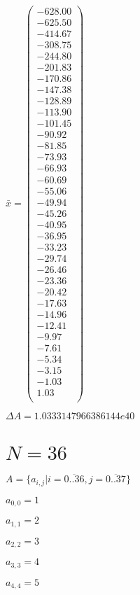 \documentclass[a4paper,12pt]{article}
\begin{document}
$\bar { x } = \begin{pmatrix}
-628.00 \\
-625.50 \\
-414.67 \\
-308.75 \\
-244.80 \\
-201.83 \\
-170.86 \\
-147.38 \\
-128.89 \\
-113.90 \\
-101.45 \\
-90.92 \\
-81.85 \\
-73.93 \\
-66.93 \\
-60.69 \\
-55.06 \\
-49.94 \\
-45.26 \\
-40.95 \\
-36.95 \\
-33.23 \\
-29.74 \\
-26.46 \\
-23.36 \\
-20.42 \\
-17.63 \\
-14.96 \\
-12.41 \\
-9.97 \\
-7.61 \\
-5.34 \\
-3.15 \\
-1.03 \\
1.03 \\
\end{pmatrix}
$

$\Delta A = 1.0333147966386144e40$



\section{ $N = 36$ }
$A = \{ a _{ i, j } | i = \overline { 0..36 }, j = \overline { 0..37 } \}$

$a _{ 0, 0 } = 1$

$a _{ 1, 1 } = 2$

$a _{ 2, 2 } = 3$

$a _{ 3, 3 } = 4$

$a _{ 4, 4 } = 5$
\end{document}
